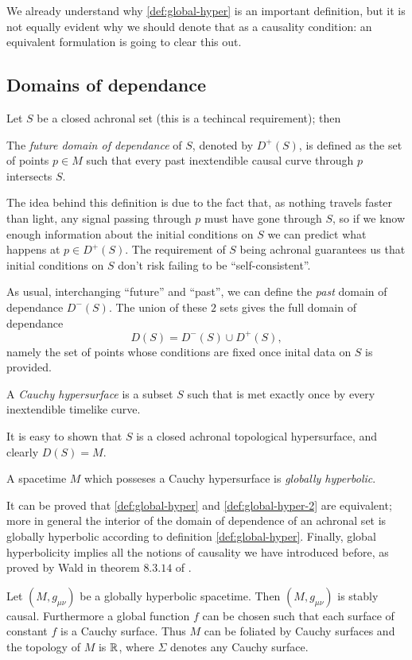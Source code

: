 We already understand why \ref{def:global-hyper} is an important definition, but it is not equally evident why we should denote that as a causality condition: an equivalent formulation is going to clear this out.

\subsection{Domains of dependance}
Let \(S\) be a closed achronal set (this is a techincal requirement); then
\begin{definition}
	The \emph{future domain of dependance} of \(S\), denoted by \(D^+(S)\), is defined as
	the set of points \(p\in M\) such that every past inextendible causal curve through \(p\) intersects \(S\).
\end{definition}

The idea behind this definition is due to the fact that, as nothing travels faster than light, any signal passing through \(p\) must have gone through \(S\), so if we know enough information about the initial conditions on \(S\) we can predict what happens at \(p\in D^+(S)\). The requirement of \(S\) being achronal guarantees us that initial conditions on \(S\) don't risk failing to be ``self-consistent''.

As usual, interchanging ``future'' and ``past'', we can define the \emph{past} domain of dependance \(D^-(S)\). The union of these \(2\) sets gives the full domain of dependance 
\[
	D(S) = D^-(S) \cup D^+(S),
\]
namely the set of points whose conditions are fixed once inital data on \(S\) is provided.
\begin{definition}
	A \emph{Cauchy hypersurface} is a subset \(S\) such that is met exactly once by every inextendible timelike curve.
\end{definition}
It is easy to shown that \(S\) is a closed achronal topological hypersurface, and clearly \(D(S) = M\).
\begin{definition}
	\label{def:global-hyper-2}
	A spacetime \(M\) which posseses a Cauchy hypersurface is \emph{globally hyperbolic}.
\end{definition}
It can be proved that \ref{def:global-hyper} and \ref{def:global-hyper-2} are equivalent; more in general the interior of the domain of dependence of an achronal set is globally hyperbolic according to definition \ref{def:global-hyper}. Finally, global hyperbolicity implies all the notions of causality we have introduced before, as proved by Wald in theorem \(8.3.14\) of \cite{wald2010general} .
\begin{theorem}
	Let \((M,g_{\mu\nu})\) be a globally hyperbolic spacetime. Then \((M,g_{\mu\nu})\) is stably causal. Furthermore a global function \(f\) can be chosen such that each surface of constant \(f\) is a Cauchy surface. Thus \(M\) can be foliated by Cauchy surfaces and the topology of \(M\) is \(\R \time\Sigma\), where \(\Sigma\) denotes any Cauchy surface.
\end{theorem}

